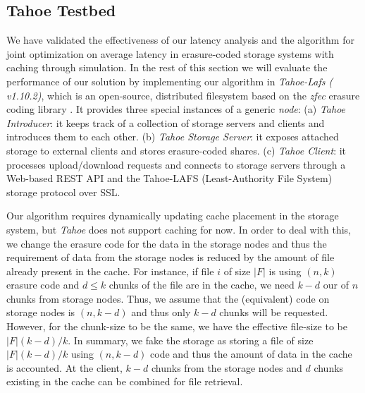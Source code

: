 \subsection{Tahoe Testbed}
We have validated the effectiveness of our latency analysis and the algorithm for joint optimization on average latency in erasure-coded storage systems with caching through simulation. In the rest of this section we will evaluate the performance of our solution by implementing our algorithm in {\em Tahoe-Lafs ( v1.10.2)}, which is an open-source, distributed filesystem based on the {\em zfec} erasure coding library \cite{tahoe}. It provides three special instances of a generic {\em node}: (a)  {\em Tahoe Introducer}: it keeps track of a collection of storage servers and clients and introduces them to each other.   (b) {\em Tahoe Storage Server}: it exposes attached storage to external clients and stores erasure-coded shares.  (c) {\em Tahoe Client}: it processes upload/download requests and connects to storage servers through a Web-based REST API and the Tahoe-LAFS (Least-Authority File System) storage protocol over SSL.

Our algorithm requires dynamically updating cache placement in the storage system, but {\em Tahoe} does not support caching for now. In order to deal with this, we change the erasure code for the data in the storage nodes and thus the requirement of data from the storage nodes is reduced by the amount of file already present in the cache. For instance, if file $i$ of size $|F|$ is using $(n,k)$ erasure code and $d\le k$ chunks of the file are in the cache, we need $k-d$ our of $n$ chunks from storage nodes. Thus,  we assume that the (equivalent) code on storage nodes is $(n,k-d)$ and thus only $k-d$ chunks will be requested. However, for the chunk-size to be the same, we have the effective file-size to be $|F|(k-d)/k$. In summary, we fake the storage as storing a file of size $|F|(k-d)/k$ using $(n,k-d)$ code and thus the amount of data in the cache is accounted. At the client, $k-d$ chunks from the storage nodes and $d$ chunks existing in the cache can be combined for file retrieval.

